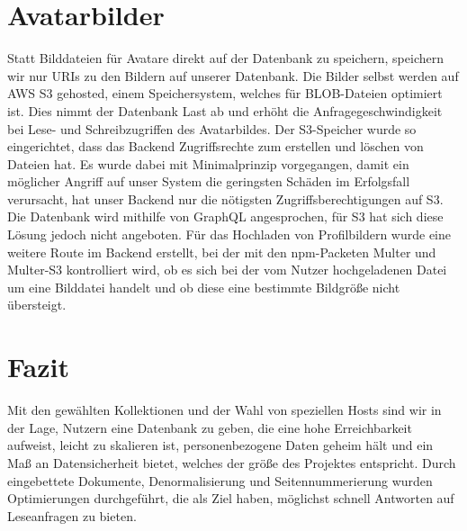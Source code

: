 \section{Avatarbilder}
Statt Bilddateien für Avatare direkt auf der Datenbank zu speichern, speichern wir nur URIs zu den Bildern auf unserer Datenbank. Die Bilder selbst werden auf AWS S3 gehosted, einem Speichersystem, welches für BLOB-Dateien optimiert ist. Dies nimmt der Datenbank Last ab und erhöht die Anfragegeschwindigkeit bei Lese- und Schreibzugriffen des Avatarbildes. Der S3-Speicher wurde so eingerichtet, dass das Backend Zugriffsrechte zum erstellen und löschen von Dateien hat. Es wurde dabei mit Minimalprinzip vorgegangen, damit ein möglicher Angriff auf unser System die geringsten Schäden im Erfolgsfall verursacht, hat unser Backend nur die nötigsten Zugriffsberechtigungen auf S3. Die Datenbank wird mithilfe von GraphQL angesprochen, für S3 hat sich diese Lösung jedoch nicht angeboten. Für das Hochladen von Profilbildern wurde eine weitere Route im Backend erstellt, bei der mit den npm-Packeten Multer und Multer-S3 kontrolliert wird, ob es sich bei der vom Nutzer hochgeladenen Datei um eine Bilddatei handelt und ob diese eine bestimmte Bildgröße nicht übersteigt.

\section{Fazit}
Mit den gewählten Kollektionen und der Wahl von speziellen Hosts sind wir in der Lage, Nutzern eine Datenbank zu geben, die eine hohe Erreichbarkeit aufweist, leicht zu skalieren ist, personenbezogene Daten geheim hält und ein Maß an Datensicherheit bietet, welches der größe des Projektes entspricht. Durch eingebettete Dokumente, Denormalisierung und Seitennummerierung wurden Optimierungen durchgeführt, die als Ziel haben, möglichst schnell Antworten auf Leseanfragen zu bieten.


